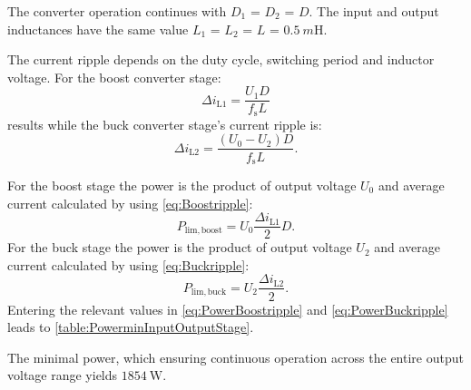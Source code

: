 \vspace{2em}\par
The converter operation continues with $D_\mathrm{1}$ = $D_\mathrm{2}$ = $D$. The input and output inductances 
have the same value $L_\mathrm{1}$ = $L_\mathrm{2}$ = $L$ = $\SI{0.5}{m\henry}$.


\begin{solutionblock}
    The current ripple depends on the duty cycle, switching period and inductor voltage.
    For the boost converter stage:
    \begin{equation}
        \Delta i_\mathrm{L1}=\frac{U_\mathrm{1}D}{f_\mathrm{s}L}
        \label{eq:Boostripple}
    \end{equation}
    results while the buck converter stage's current ripple is:
    \begin{equation}
        \Delta i_\mathrm{L2}=\frac{\left(U_\mathrm{0}-U_\mathrm{2}\right)D}{f_\mathrm{s}L}.
        \label{eq:Buckripple}
    \end{equation}
\end{solutionblock}


\begin{solutionblock}
    For the boost stage the power is the product of output voltage
     $U_\mathrm{0}$ and average current calculated by using \eqref{eq:Boostripple}:
    \begin{equation}
        P_\mathrm{lim,boost}=U_\mathrm{0}\frac{\Delta i_\mathrm{L1}}{2}D.
        \label{eq:PowerBoostripple}
    \end{equation}
    For the buck stage the power is the product of output voltage
    $U_\mathrm{2}$ and average current calculated by using \eqref{eq:Buckripple}:
    \begin{equation}
        P_\mathrm{lim,buck}=U_\mathrm{2}\frac{\Delta i_\mathrm{L2}}{2}.
        \label{eq:PowerBuckripple}
    \end{equation}
    Entering the relevant values in \eqref{eq:PowerBoostripple} and \eqref{eq:PowerBuckripple} leads to \autoref{table:PowerminInputOutputStage}.
    
    The minimal power, which ensuring continuous operation across the entire output voltage range
    yields  $\SI{1854}{\watt}$.
\end{solutionblock}

